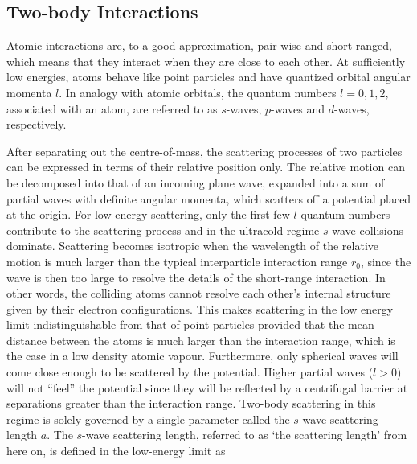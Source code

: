 \subsection{Two-body Interactions}
Atomic interactions are, to a good approximation, pair-wise and short ranged, which means that they interact when they are close to each other. At sufficiently low energies, atoms behave like point particles and have quantized orbital angular momenta $l$. In analogy with atomic orbitals, the quantum numbers $l=0,1,2,$ associated with an atom, are referred to as $s$-waves, $p$-waves and $d$-waves, respectively. 

After separating out the centre-of-mass, the scattering processes of two particles can be expressed in terms of their relative position only. The relative motion can be decomposed into that of an incoming plane wave, expanded into a sum of partial waves with definite angular momenta, which scatters off a potential placed at the origin. For low energy scattering, only the first few $l$-quantum numbers contribute to the scattering process and in the ultracold regime $s$-wave collisions dominate. Scattering becomes isotropic when the wavelength of the relative motion is much larger than the typical interparticle interaction range $r_0$, since the wave is then too large to resolve the details of the short-range interaction. In other words, the colliding atoms cannot resolve each other's internal structure given by their electron configurations. This makes scattering in the low energy limit indistinguishable from that of point particles provided that the mean distance between the atoms is much larger than the interaction range, which is the case in a low density atomic vapour. Furthermore, only spherical waves will come close enough to be scattered by the potential. Higher partial waves ($l>0$) will not ``feel'' the potential since they will be reflected by a centrifugal barrier at separations greater than the interaction range. Two-body scattering in this regime is solely governed by a single parameter called the $s$-wave scattering length $a$. The $s$-wave scattering length, referred to as `the scattering length' from here on, is defined in the low-energy limit as

